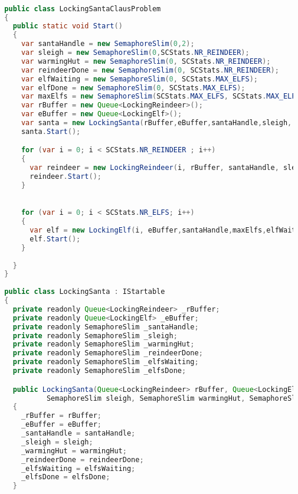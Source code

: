 \begin{lstlisting}[label=lst:impl_santa_lock,
  caption={Lock based Santa Clause implementation},
  language=Java,  
  showspaces=false,
  showtabs=false,
  breaklines=true,
  showstringspaces=false,
  breakatwhitespace=true,
  commentstyle=\color{greencomments},
  keywordstyle=\color{bluekeywords},
  stringstyle=\color{redstrings},
  escapechar=~,
  morekeywords={atomic, retry, orelse, var, get, set, ref, out, readonly, virtual, override}]  % Start your code-block

  public class LockingSantaClausProblem
  {
    public static void Start()
    {
      var santaHandle = new SemaphoreSlim(0,2); 
      var sleigh = new SemaphoreSlim(0,SCStats.NR_REINDEER);
      var warmingHut = new SemaphoreSlim(0, SCStats.NR_REINDEER);
      var reindeerDone = new SemaphoreSlim(0, SCStats.NR_REINDEER);
      var elfWaiting = new SemaphoreSlim(0, SCStats.MAX_ELFS);
      var elfDone = new SemaphoreSlim(0, SCStats.MAX_ELFS);
      var maxElfs = new SemaphoreSlim(SCStats.MAX_ELFS, SCStats.MAX_ELFS);
      var rBuffer = new Queue<LockingReindeer>();
      var eBuffer = new Queue<LockingElf>();
      var santa = new LockingSanta(rBuffer,eBuffer,santaHandle,sleigh, warmingHut,reindeerDone,elfWaiting, elfDone);
      santa.Start();

      for (var i = 0; i < SCStats.NR_REINDEER ; i++)
      {
        var reindeer = new LockingReindeer(i, rBuffer, santaHandle, sleigh, warmingHut, reindeerDone);
        reindeer.Start();
      }

            
      for (var i = 0; i < SCStats.NR_ELFS; i++)
      {
        var elf = new LockingElf(i, eBuffer,santaHandle,maxElfs,elfWaiting,elfDone);
        elf.Start();
      }
            
    }
  }
  
  public class LockingSanta : IStartable
  {
    private readonly Queue<LockingReindeer> _rBuffer;
    private readonly Queue<LockingElf> _eBuffer;
    private readonly SemaphoreSlim _santaHandle;
    private readonly SemaphoreSlim _sleigh;
    private readonly SemaphoreSlim _warmingHut;
    private readonly SemaphoreSlim _reindeerDone;
    private readonly SemaphoreSlim _elfsWaiting;
    private readonly SemaphoreSlim _elfsDone;

    public LockingSanta(Queue<LockingReindeer> rBuffer, Queue<LockingElf> eBuffer, SemaphoreSlim santaHandle,
            SemaphoreSlim sleigh, SemaphoreSlim warmingHut, SemaphoreSlim reindeerDone, SemaphoreSlim elfsWaiting, SemaphoreSlim elfsDone)
    {
      _rBuffer = rBuffer;
      _eBuffer = eBuffer;
      _santaHandle = santaHandle;
      _sleigh = sleigh;
      _warmingHut = warmingHut;
      _reindeerDone = reindeerDone;
      _elfsWaiting = elfsWaiting;
      _elfsDone = elfsDone;
    }


\end{lstlisting}
